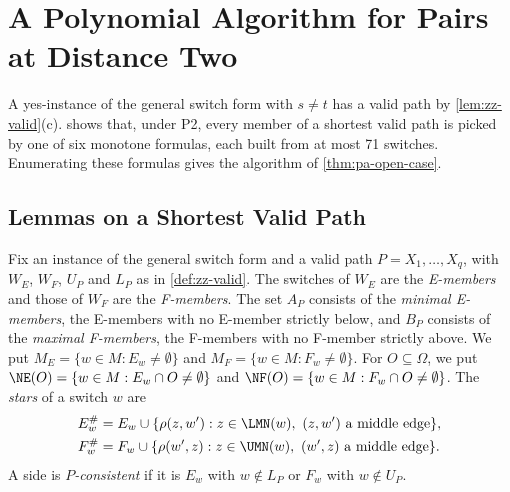 
\section{A Polynomial Algorithm for Pairs at Distance Two}
\label{sec:pa-polynomial}

A yes-instance of the general switch form with $s \neq t$ has a valid path by \cref{lem:zz-valid}(c).
 shows that, under P2, every member of a shortest valid path is picked by one of six monotone formulas, each built from at most 71 switches.
Enumerating these formulas gives the algorithm of \cref{thm:pa-open-case}.

\subsection{Lemmas on a Shortest Valid Path}
\label{sec:pa-shortest}

\begin{definition}
\label{def:pa-objects}
Fix an instance of the general switch form and a valid path $P = X_1, \dots, X_q$, with $W_E$, $W_F$, $U_P$ and $L_P$ as in \cref{def:zz-valid}.
The switches of $W_E$ are the \emph{E-members} and those of $W_F$ are the \emph{F-members}.
The set $A_P$ consists of the \emph{minimal E-members}, the E-members with no E-member strictly below, and $B_P$ consists of the \emph{maximal F-members}, the F-members with no F-member strictly above.
We put $M_E = \{w \in M : E_w \neq \emptyset\}$ and $M_F = \{w \in M : F_w \neq \emptyset\}$.
For $O \subseteq \Omega$, we put $\NE(O) = \{w \in M : E_w \cap O \neq \emptyset\}$ and $\NF(O) = \{w \in M : F_w \cap O \neq \emptyset\}$.
The \emph{stars} of a switch $w$ are
\begin{align*}
E^\#_w &= E_w \cup \{\rho(z, w') : z \in \LMN(w),\ (z, w') \text{ a middle edge}\},\\
F^\#_w &= F_w \cup \{\rho(w', z) : z \in \UMN(w),\ (w', z) \text{ a middle edge}\}.
\end{align*}
A side is \emph{$P$-consistent} if it is $E_w$ with $w \notin L_P$ or $F_w$ with $w \notin U_P$.
\end{definition}

